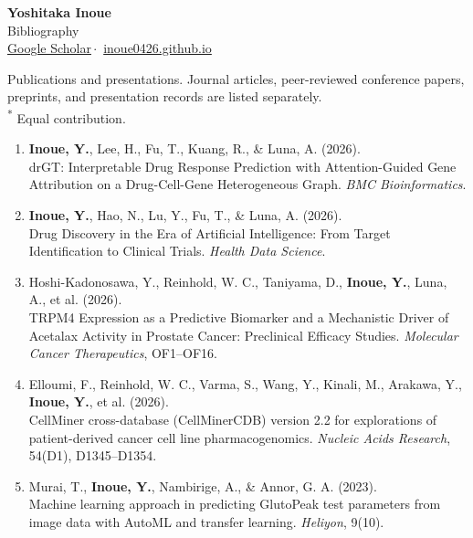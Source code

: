 \documentclass[11pt]{article}
\def\name{Yoshitaka Inoue}
\def\scholar{\href{https://scholar.google.com/citations?user=aBizyLkAAAAJ\&hl=en}{Google Scholar}}
\def\website{\href{https://inoue0426.github.io/}{inoue0426.github.io}}
\newcommand{\publication}[3]{%
  \entryspace\item #1\\
  #2. #3
}
\begin{document}
\begin{center}
  {\huge \textbf{\name}}\\
  \vspace{0.2em}
  {\Large Bibliography}\\
  \vspace{0.3em}
  \scholar \,$\cdot$\, \website
\end{center}

\noindent
Publications and presentations. Journal articles, peer-reviewed conference papers,
preprints, and presentation records are listed separately.\\[3pt]
{\small\textsuperscript{*} Equal contribution.}


\begin{enumerate}[label={J\arabic*.}]

  \publication
  {\textbf{Inoue, Y.}, Lee, H., Fu, T., Kuang, R., \& Luna, A. (2026).}
  {drGT: Interpretable Drug Response Prediction with Attention-Guided Gene Attribution on a Drug-Cell-Gene Heterogeneous Graph}
  {\textit{BMC Bioinformatics}.}

  \publication
  {\textbf{Inoue, Y.}, Hao, N., Lu, Y., Fu, T., \& Luna, A. (2026).}
  {Drug Discovery in the Era of Artificial Intelligence: From Target Identification to Clinical Trials}
  {\textit{Health Data Science}.}

  \publication
  {Hoshi-Kadonosawa, Y., Reinhold, W. C., Taniyama, D., \textbf{Inoue, Y.}, Luna, A., et al. (2026).}
  {TRPM4 Expression as a Predictive Biomarker and a Mechanistic Driver of Acetalax Activity in Prostate Cancer: Preclinical Efficacy Studies}
  {\textit{Molecular Cancer Therapeutics}, OF1--OF16.}

  \publication
  {Elloumi, F., Reinhold, W. C., Varma, S., Wang, Y., Kinali, M., Arakawa, Y., \textbf{Inoue, Y.}, et al. (2026).}
  {CellMiner cross-database (CellMinerCDB) version 2.2 for explorations of patient-derived cancer cell line pharmacogenomics}
  {\textit{Nucleic Acids Research}, 54(D1), D1345--D1354.}

  \publication
  {Murai, T., \textbf{Inoue, Y.}, Nambirige, A., \& Annor, G. A. (2023).}
  {Machine learning approach in predicting GlutoPeak test parameters from image data with AutoML and transfer learning}
  {\textit{Heliyon}, 9(10).}

\end{enumerate}

\end{document}
